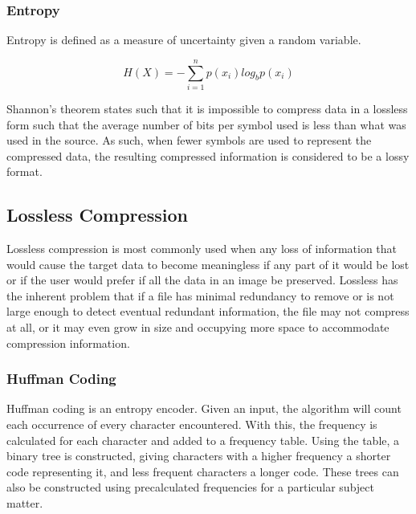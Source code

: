 \documentclass[12pt]{article}
\begin{document}
\subsubsection{Entropy}
Entropy is defined as a measure of uncertainty given a random variable.

\[
H(X) = -\sum_{i=1}^{n} p(x_i)log_b p(x_i)
\]

Shannon's theorem states such that it is impossible to compress data in a lossless form such that the average number of bits per symbol used is less than what was used in the source. As such, when fewer symbols are used to represent the compressed data, the resulting compressed information is considered to be a lossy format. \citep{Shannon}

\subsection{Lossless Compression}
Lossless compression is most commonly used when any loss of information that would cause the target data to become meaningless if any part of it would be lost or if the user would prefer if all the data in an image be preserved. Lossless has the inherent problem that if a file has minimal redundancy to remove or is not large enough to detect eventual redundant information, the file may not compress at all, or it may even grow in size and occupying more space to accommodate compression information.

\subsubsection{Huffman Coding}
Huffman coding is an entropy encoder. Given an input, the algorithm will count each occurrence of every character encountered. With this, the frequency is calculated for each character and added to a frequency table. Using the table, a binary tree is constructed, giving characters with a higher frequency a shorter code representing it, and less frequent characters a longer code. These trees can also be constructed using precalculated frequencies for a particular subject matter.
\end{document}
